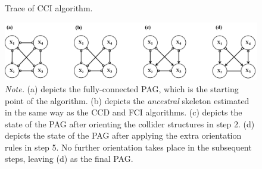 \documentclass[twoside, 11pt]{article}
\newcommand{\circirc}{%
\begin{tikzpicture}[baseline=-3pt] 
    \draw [{Circle[open]}-{Circle[open]}] (0,0) -- (0.5, 0);
\end{tikzpicture}
}
\newcommand*{\figref}[2][]{%
  \hyperref[{fig:#2}]{%
    Figure~\ref*{fig:#2}%
    \ifx\\#1\\%
    \else
      #1%
    \fi
  }%
}
\begin{document}


\begin{figure}[!t]
    \centering
        \caption{Trace of CCI algorithm.}
        \includegraphics[width=1\textwidth]{figures/Fig8.pdf}
        \vspace{1mm}
        \caption*{\small{\textit{Note.} (a) depicts the fully-connected PAG, which is the starting point of the algorithm. (b) depicts the \textit{ancestral} skeleton estimated in the same way as the CCD and FCI algorithms. (c) depicts the state of the PAG after orienting the collider structures in step 2. (d) depicts the state of the PAG after applying the extra orientation rules in step 5. No further orientation takes place in the subsequent steps, leaving (d) as the final PAG.}}
    \label{fig:9}
\end{figure}
\end{document}
